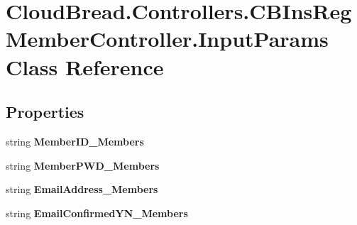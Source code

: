 \hypertarget{class_cloud_bread_1_1_controllers_1_1_c_b_ins_reg_member_controller_1_1_input_params}{}\section{Cloud\+Bread.\+Controllers.\+C\+B\+Ins\+Reg\+Member\+Controller.\+Input\+Params Class Reference}
\label{class_cloud_bread_1_1_controllers_1_1_c_b_ins_reg_member_controller_1_1_input_params}
\subsection*{Properties}
\begin{DoxyCompactItemize}
\item 
string {\bfseries Member\+I\+D\+\_\+\+Members}\hypertarget{class_cloud_bread_1_1_controllers_1_1_c_b_ins_reg_member_controller_1_1_input_params_ae3298401d25bde692042f8d933dd045d}{}\label{class_cloud_bread_1_1_controllers_1_1_c_b_ins_reg_member_controller_1_1_input_params_ae3298401d25bde692042f8d933dd045d}

\item 
string {\bfseries Member\+P\+W\+D\+\_\+\+Members}\hypertarget{class_cloud_bread_1_1_controllers_1_1_c_b_ins_reg_member_controller_1_1_input_params_a88d7236bed4cb796ad47fce33b341117}{}\label{class_cloud_bread_1_1_controllers_1_1_c_b_ins_reg_member_controller_1_1_input_params_a88d7236bed4cb796ad47fce33b341117}

\item 
string {\bfseries Email\+Address\+\_\+\+Members}\hypertarget{class_cloud_bread_1_1_controllers_1_1_c_b_ins_reg_member_controller_1_1_input_params_a6b75f22014fba445c01f61c91195bfa2}{}\label{class_cloud_bread_1_1_controllers_1_1_c_b_ins_reg_member_controller_1_1_input_params_a6b75f22014fba445c01f61c91195bfa2}

\item 
string {\bfseries Email\+Confirmed\+Y\+N\+\_\+\+Members}\hypertarget{class_cloud_bread_1_1_controllers_1_1_c_b_ins_reg_member_controller_1_1_input_params_a44be5e1d17fb1977c00d73b35a4cf8d8}{}\label{class_cloud_bread_1_1_controllers_1_1_c_b_ins_reg_member_controller_1_1_input_params_a44be5e1d17fb1977c00d73b35a4cf8d8}


\end{DoxyCompactItemize}
